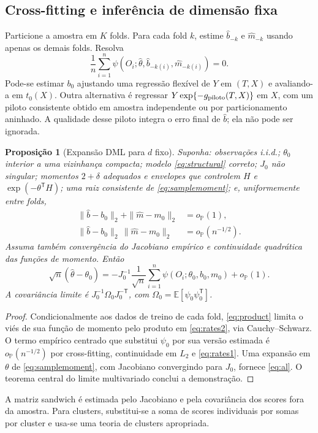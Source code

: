 \documentclass[11pt,a4paper]{article}
\newtheorem{theorem}{Proposição}[section]
\newcommand{\E}{\mathbb E}
\newcommand{\Pp}{\mathbb P}
\newcommand{\op}{o_{\Pp}}
\begin{document}
\subsection{Cross-fitting e inferência de dimensão fixa}
Particione a amostra em $K$ folds. Para cada fold $k$, estime $\hat b_{-k}$ e $\hat m_{-k}$ usando apenas os demais folds. Resolva
\begin{equation}
\frac1n\sum_{i=1}^n\psi(O_i;\hat\theta,\hat b_{-k(i)},\hat m_{-k(i)})=0.
\label{eq:samplemoment}
\end{equation}
Pode-se estimar $b_0$ ajustando uma regressão flexível de $Y$ em $(T,X)$ e avaliando-a em $t_0(X)$. Outra alternativa é regressar $Y\exp\{-g_{\rm piloto}(T,X)\}$ em $X$, com um piloto consistente obtido em amostra independente ou por particionamento aninhado. A qualidade desse piloto integra o erro final de $\hat b$; ela não pode ser ignorada.

\begin{theorem}[Expansão DML para $d$ fixo]
\label{prop:clt}
Suponha: observações i.i.d.; $\theta_0$ interior a uma vizinhança compacta; modelo \eqref{eq:structural} correto; $J_0$ não singular; momentos $2+\delta$ adequados e envelopes que controlem $H$ e $\exp(-\theta^{\mathsf T}H)$; uma raiz consistente de \eqref{eq:samplemoment}; e, uniformemente entre folds,
\begin{align}
\|\hat b-b_0\|_2+\|\hat m-m_0\|_2&=\op(1),\label{eq:rates1}\\
\|\hat b-b_0\|_2\,\|\hat m-m_0\|_2&=\op(n^{-1/2}).\label{eq:rates2}
\end{align}
Assuma também convergência do Jacobiano empírico e continuidade quadrática das funções de momento. Então
\begin{equation}
\sqrt n(\hat\theta-\theta_0)
=-J_0^{-1}\frac1{\sqrt n}\sum_{i=1}^n
\psi(O_i;\theta_0,b_0,m_0)+\op(1).
\label{eq:al}
\end{equation}
A covariância limite é $J_0^{-1}\Omega_0J_0^{-\mathsf T}$, com $\Omega_0=\E[\psi_0\psi_0^{\mathsf T}]$.
\end{theorem}
\begin{proof}
Condicionalmente aos dados de treino de cada fold, \eqref{eq:product} limita o viés de sua função de momento pelo produto em \eqref{eq:rates2}, via Cauchy--Schwarz. O termo empírico centrado que substitui $\psi_0$ por sua versão estimada é $\op(n^{-1/2})$ por cross-fitting, continuidade em $L_2$ e \eqref{eq:rates1}. Uma expansão em $\theta$ de \eqref{eq:samplemoment}, com Jacobiano convergindo para $J_0$, fornece \eqref{eq:al}. O teorema central do limite multivariado conclui a demonstração.
\end{proof}
A matriz sandwich é estimada pelo Jacobiano e pela covariância dos scores fora da amostra. Para clusters, substitui-se a soma de scores individuais por somas por cluster e usa-se uma teoria de clusters apropriada.
\end{document}
